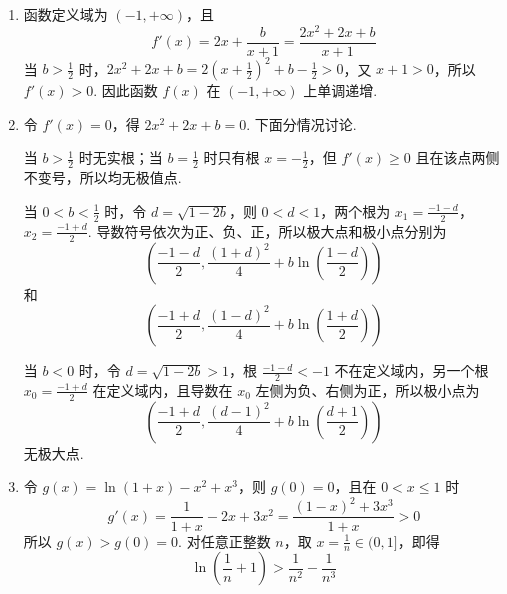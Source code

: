 \begin{solution}
\begin{enumerate}
\item 函数定义域为 \((-1,+\infty)\)，且
\[
f'(x)=2x+\frac{b}{x+1}=\frac{2x^2+2x+b}{x+1}
\]
当 \(b>\frac{1}{2}\) 时，\(2x^2+2x+b=2\left(x+\frac{1}{2}\right)^2+b-\frac{1}{2}>0\)，又 \(x+1>0\)，所以 \(f'(x)>0\). 因此函数 \(f(x)\) 在 \((-1,+\infty)\) 上单调递增.
\item 令 \(f'(x)=0\)，得 \(2x^2+2x+b=0\). 下面分情况讨论.

当 \(b>\frac{1}{2}\) 时无实根；当 \(b=\frac{1}{2}\) 时只有根 \(x=-\frac{1}{2}\)，但 \(f'(x)\geqslant0\) 且在该点两侧不变号，所以均无极值点.

当 \(0<b<\frac{1}{2}\) 时，令 \(d=\sqrt{1-2b}\)，则 \(0<d<1\)，两个根为 \(x_1=\frac{-1-d}{2}\)，\(x_2=\frac{-1+d}{2}\). 导数符号依次为正、负、正，所以极大点和极小点分别为
\[
\left(\frac{-1-d}{2},\frac{(1+d)^2}{4}+b\ln\left(\frac{1-d}{2}\right)\right)
\]
和
\[
\left(\frac{-1+d}{2},\frac{(1-d)^2}{4}+b\ln\left(\frac{1+d}{2}\right)\right)
\]

当 \(b<0\) 时，令 \(d=\sqrt{1-2b}>1\)，根 \(\frac{-1-d}{2}<-1\) 不在定义域内，另一个根 \(x_0=\frac{-1+d}{2}\) 在定义域内，且导数在 \(x_0\) 左侧为负、右侧为正，所以极小点为
\[
\left(\frac{-1+d}{2},\frac{(d-1)^2}{4}+b\ln\left(\frac{d+1}{2}\right)\right)
\]
无极大点.
\item 令 \(g(x)=\ln(1+x)-x^2+x^3\)，则 \(g(0)=0\)，且在 \(0<x\leqslant1\) 时
\[
g'(x)=\frac{1}{1+x}-2x+3x^2=\frac{(1-x)^2+3x^3}{1+x}>0
\]
所以 \(g(x)>g(0)=0\). 对任意正整数 \(n\)，取 \(x=\frac{1}{n}\in(0,1]\)，即得
\[
\ln\left(\frac{1}{n}+1\right)>\frac{1}{n^2}-\frac{1}{n^3}
\]
\end{enumerate}
\end{solution}
